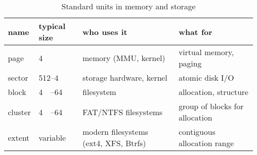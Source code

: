 \documentclass[openany, 12pt]{book}
\begin{document}
\begin{table}[h]
	\centering
	\begin{tabular}{llll}
		\toprule
		\textbf{name} & \textbf{typical size}                   & \textbf{who uses it}                  & \textbf{what for}              \\
		\midrule
		page          & \SI{4}{\kibi\byte}                      & memory (MMU, kernel)                  & virtual memory, paging         \\
		sector        & \SI{512}{\byte}--\SI{4}{\kibi\byte}     & storage hardware, kernel              & atomic disk I/O                \\
		block         & \SI{4}{\kibi\byte}--\SI{64}{\kibi\byte} & filesystem                            & allocation, structure          \\
		cluster       & \SI{4}{\kibi\byte}--\SI{64}{\kibi\byte} & FAT/NTFS filesystems                  & group of blocks for allocation \\
		extent        & variable                                & modern filesystems (ext4, XFS, Btrfs) & contiguous allocation range    \\
		\bottomrule
	\end{tabular}
	\caption{Standard units in memory and storage}
\end{table}
\end{document}
